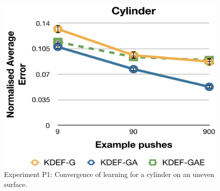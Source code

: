 \begin{figure}[t]
\centerline{
\includegraphics[width=0.9\columnwidth]{./L1av-graph-cyl-sim}
}
\vspace{-1mm}
\caption{Experiment P1: Convergence of learning for a cylinder on an uneven surface. \label{fig:Lgraph-uneven}}
\end{figure}

\newlength{\imgwid}
\setlength{\imgwid}{2.5cm}

